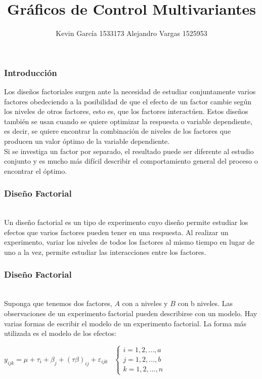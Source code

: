 \documentclass[12pt]{beamer}
\author[Kevin - Alejandro]{Kevin García 1533173 \newline Alejandro Vargas 1525953}
\title[Gráficos de Control Multivariantes]{Gráficos de Control Multivariantes}
\begin{document}
\justifying
\begin{frame}[plain]
\maketitle
\end{frame}


\begin{frame}
\frametitle{Introducción}
Los diseños factoriales surgen ante la necesidad de estudiar conjuntamente varios factores obedeciendo a la posibilidad de que el efecto de un factor cambie según los niveles de otros factores, esto es, que los factores interactúen. Estos diseños también se usan cuando se quiere
optimizar la respuesta o variable dependiente, es decir, se quiere encontrar la combinación de niveles de los factores que producen un valor óptimo de la variable dependiente.
~\\Si se investiga un factor por separado, el resultado puede ser diferente al estudio conjunto y es mucho más difícil describir el comportamiento general del proceso o encontrar el óptimo.
\end{frame}

\begin{frame}
\frametitle{Diseño Factorial}
~\\Un diseño factorial es un tipo de experimento cuyo diseño permite estudiar los efectos que varios factores pueden tener en una respuesta. Al realizar un experimento, variar los niveles de todos los factores al mismo tiempo en lugar de uno a la vez, permite estudiar las interacciones entre los factores.

\end{frame}

\begin{frame}
\frametitle{Diseño Factorial}
~\\Suponga que tenemos dos factores, $A$ con a niveles y $B$ con b niveles. Las observaciones de un experimento factorial pueden describirse con un modelo. Hay varias formas de escribir el modelo de un experimento factorial. La forma más utilizada es el modelo de los efectos:
\begin{center}
$y_{ijk}=\mu+\tau_i+\beta_j+(\tau\beta)_{ij}+\varepsilon_{ijk} \;\;\; \left \{\begin{array}{c} i=1,2,...,a \\ j=1,2,...,b \\ k=1,2,...,n \end{array}\right. $
\end{center}
\end{frame}
\end{document}
